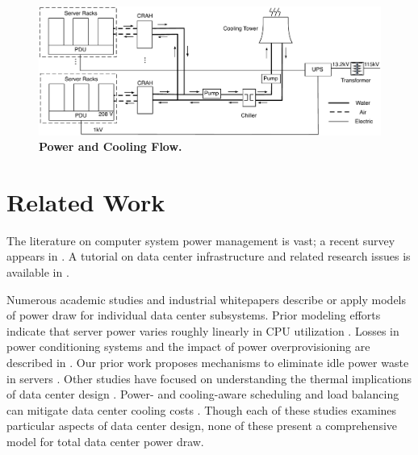 \begin{figure}[!ht]
\centering
\includegraphics[width = 6.5 in]{Appendices/WEED/figure/HeatFlow.pdf}
\caption{ \textbf{Power and Cooling Flow.} }
\label{figure::PowerFlow}
\vspace{-.1 in}
\end{figure}

\section{Related Work}


The literature on computer system power management is vast; a recent survey appears in \cite{KaxirasBook08}.  A tutorial on data center infrastructure and related research issues is available in \cite{BarrosoBook09}.  

Numerous academic studies and industrial whitepapers describe or apply models of power draw for individual data center subsystems.  Prior modeling efforts indicate that server power varies roughly linearly in CPU utilization \cite{Fan07,Rivoire08}. Losses in power conditioning systems and the impact of power overprovisioning are described in \cite{Fan07, Rasmussen113}. Our prior work proposes mechanisms to eliminate idle power waste in servers \cite{Meisner09}.  Other studies have focused on understanding the thermal implications of data center design  \cite{Heath06, Patel02}.  Power- and cooling-aware scheduling and load balancing can mitigate data center cooling costs  \cite{Moore06, Parolini08}.  Though each of these studies examines particular aspects of data center design, none of these present a comprehensive model for total data center power draw.  




